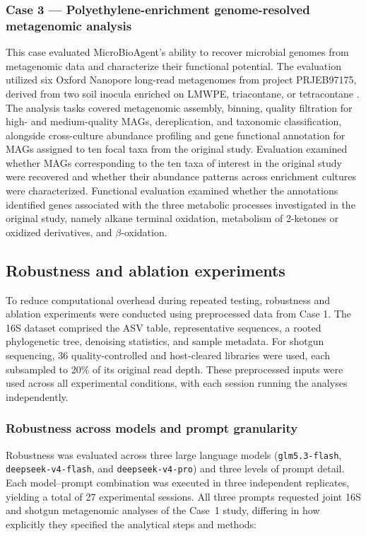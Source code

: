 \documentclass[10pt,letterpaper]{article}
\begin{document}
\subsubsection{Case 3 --- Polyethylene-enrichment genome-resolved metagenomic analysis}
\label{sec:methods-mag}

This case evaluated MicroBioAgent's ability to recover microbial genomes
from metagenomic data and characterize their functional potential. The
evaluation utilized six Oxford Nanopore long-read metagenomes from project
PRJEB97175, derived from two soil inocula
enriched on LMWPE, triacontane, or tetracontane \parencite{sandholm2025polyethylene}.
The analysis tasks covered metagenomic assembly, binning, quality filtration
for high- and medium-quality MAGs,
dereplication, and taxonomic classification, alongside cross-culture
abundance profiling and gene functional annotation for MAGs assigned to ten
focal taxa from the original study. Evaluation examined whether MAGs
corresponding to the ten taxa of interest in the original study were
recovered and whether their abundance patterns across enrichment cultures
were characterized. Functional evaluation examined whether the annotations
identified genes associated with the three metabolic processes investigated
in the original study, namely alkane terminal oxidation, metabolism of
2-ketones or oxidized derivatives, and $\beta$-oxidation.

\subsection{Robustness and ablation experiments}
\label{sec:reliability-experiments}

To reduce computational overhead during repeated testing, robustness and
ablation experiments were conducted using preprocessed data from Case 1.
The 16S dataset comprised the ASV table, representative sequences, a rooted
phylogenetic tree, denoising statistics, and sample metadata. For shotgun
sequencing, 36 quality-controlled and host-cleared libraries were used, each
subsampled to 20\% of its original read depth. These preprocessed inputs were
used across all experimental conditions, with each session running the
analyses independently.

\subsubsection{Robustness across models and prompt granularity}

Robustness was evaluated across three large language models
(\texttt{glm5.3-flash}, \texttt{deepseek-v4-flash}, and
\texttt{deepseek-v4-pro}) and three levels of prompt detail. Each
model--prompt combination was executed in three independent replicates,
yielding a total of 27 experimental sessions. All three prompts requested
joint 16S and shotgun metagenomic analyses of the Case~1 study, differing in
how explicitly they specified the analytical steps and methods:
\end{document}
